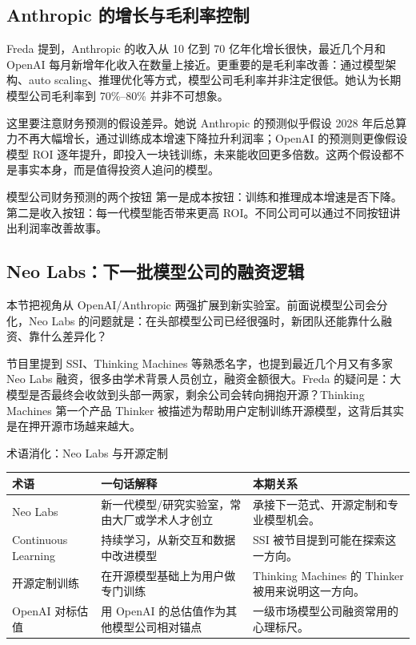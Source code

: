 \documentclass[a4paper]{article}
\begin{document}
\subsection{Anthropic 的增长与毛利率控制}

Freda 提到，Anthropic 的收入从 10 亿到 70 亿年化增长很快，最近几个月和 OpenAI 每月新增年化收入在数量上接近。更重要的是毛利率改善：通过模型架构、auto scaling、推理优化等方式，模型公司毛利率并非注定很低。她认为长期模型公司毛利率到 70\%--80\% 并非不可想象。

这里要注意财务预测的假设差异。她说 Anthropic 的预测似乎假设 2028 年后总算力不再大幅增长，通过训练成本增速下降拉升利润率；OpenAI 的预测则更像假设模型 ROI 逐年提升，即投入一块钱训练，未来能收回更多倍数。这两个假设都不是事实本身，而是值得投资人追问的模型。

\begin{importantbox}{模型公司财务预测的两个按钮}
第一是成本按钮：训练和推理成本增速是否下降。第二是收入按钮：每一代模型能否带来更高 ROI。不同公司可以通过不同按钮讲出利润率改善故事。
\end{importantbox}

\subsection{Neo Labs：下一批模型公司的融资逻辑}

本节把视角从 OpenAI/Anthropic 两强扩展到新实验室。前面说模型公司会分化，Neo Labs 的问题就是：在头部模型公司已经很强时，新团队还能靠什么融资、靠什么差异化？

节目里提到 SSI、Thinking Machines 等熟悉名字，也提到最近几个月又有多家 Neo Labs 融资，很多由学术背景人员创立，融资金额很大。Freda 的疑问是：大模型是否最终会收敛到头部一两家，剩余公司会转向拥抱开源？Thinking Machines 第一个产品 Thinker 被描述为帮助用户定制训练开源模型，这背后其实是在押开源市场越来越大。

\begin{knowledgebox}{术语消化：Neo Labs 与开源定制}
\begin{tabularx}{\textwidth}{p{}p{}X}
\toprule
术语 & 一句话解释 & 本期关系 \\
\midrule
Neo Labs & 新一代模型/研究实验室，常由大厂或学术人才创立 & 承接下一范式、开源定制和专业模型机会。 \\
Continuous Learning & 持续学习，从新交互和数据中改进模型 & SSI 被节目提到可能在探索这一方向。 \\
开源定制训练 & 在开源模型基础上为用户做专门训练 & Thinking Machines 的 Thinker 被用来说明这一方向。 \\
OpenAI 对标估值 & 用 OpenAI 的总估值作为其他模型公司相对锚点 & 一级市场模型公司融资常用的心理标尺。 \\
\bottomrule
\end{tabularx}
\end{knowledgebox}
\end{document}
